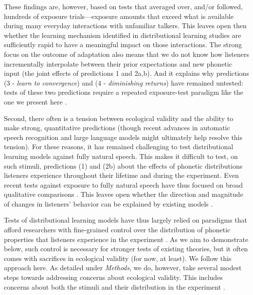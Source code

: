 \documentclass[
  11pt,
  man,mask,floatsintext]{apa6}
\begin{document}
These findings are, however, based on tests that averaged over, and/or followed, hundreds of exposure trials---exposure amounts that exceed what is available during many everyday interactions with unfamiliar talkers. This leaves open then whether the learning mechanism identified in distributional learning studies are sufficiently rapid to have a meaningful impact on those interactions. The strong focus on the outcome of adaptation also means that we do not know how listeners incrementally interpolate between their prior expectations and new phonetic input (the joint effects of predictions 1 and 2a,b). And it explains why predictions (3 - \emph{learn to convergence}) and (4 - \emph{diminishing returns}) have remained untested: tests of these two predictions require a repeated exposure-test paradigm like the one we present here \autocites[for discussion, see][]{cummings-theodore2023,kleinschmidt2020}.

Second, there often is a tension between ecological validity and the ability to make strong, quantitative predictions (though recent advances in automatic speech recognition and large language models might ultimately help resolve this tension). For these reasons, it has remained challenging to test distributional learning models against fully natural speech. This makes it difficult to test, on such stimuli, predictions (1) and (2b) about the effects of phonetic distributions listeners experience throughout their lifetime and during the experiment. Even recent tests against exposure to fully natural speech have thus focused on broad qualitative comparisons \autocites[e.g.,][]{schertz2016,xie2017}[see also,][]{schertz-clare2020}. This leaves open whether the direction and magnitude of changes in listeners' behavior can be explained by existing models \autocites[but see][]{hitczenko-feldman2016,tan2021,xie2021cognition}.

Tests of distributional learning models have thus largely relied on paradigms that afford researchers with fine-grained control over the distribution of phonetic properties that listeners experience in the experiment \autocites[e.g.,][]{chladkova2017,clayards2008,colby2018,idemaru-holt2011,kleinschmidt2020,theodore-monto2019}. As we aim to demonstrate below, such control is necessary for stronger tests of existing theories, but it often comes with sacrifices in ecological validity (for now, at least). We follow this approach here. As detailed under \emph{Methods}, we do, however, take several modest steps towards addressing concerns about ecological validity. This includes concerns about both the stimuli and their distribution in the experiment \autocite[see discussion in][]{baese-berk2018}.
\end{document}
